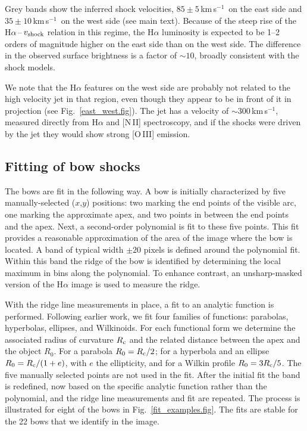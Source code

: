 \documentclass{nature_arxiv}
\newcommand{\kms}{km\,s$^{-1}$}
\begin{document}
\begin{methods}
Grey bands show the inferred shock velocities, $85\pm 5$\,\kms\
on the east side and $35\pm 10$\,\kms\ on the west side (see main text).
Because of the steep rise of the H$\alpha$\,--\,$v_{\rm shock}$ relation
in this regime, the H$\alpha$
luminosity is expected to be 1--2 orders of magnitude higher on the east side than
on the west side. The difference in the
observed surface brightness is a factor of $\sim 10$, broadly consistent with the
shock models.

We note that the H$\alpha$ features on the west side are probably not
related to the
high velocity jet in that region, even though they appear to be in front
of it in projection (see Fig.\ \ref{east_west.fig}). The jet has
a velocity of $\sim 300$\,\kms, measured directly from H$\alpha$ and
[N\,II] spectroscopy,\cite{meaburn:13} and
if the shocks were driven by the jet they would show strong [O\,III] emission.





\subsection{Fitting of bow shocks\vspace{0.3cm}\\}

The bows are fit in the following way.
A bow is initially characterized by
five manually-selected ($x$,$y$) positions:
two marking the end points of the visible arc,
one marking the approximate apex, and two points in between the end points and
the apex. Next, a second-order polynomial is fit to these five points. This
fit provides a reasonable approximation of the area of the image where the bow
is located. A band of typical width $\pm 20$ pixels is defined around the
polynomial fit. Within this band the
ridge of the bow is identified by determining the local maximum in bins along
the polynomial. To enhance contrast,
an unsharp-masked version of the H$\alpha$ image is used to measure the ridge.

With the ridge line measurements in place,
a fit to an analytic function is
performed. Following earlier work,\cite{tarango:18} we fit four families of
functions: parabolas, hyperbolas, ellipses, and Wilkinoids.\cite{Wilkin1996}
For each functional form we determine the associated radius of curvature $R_{\rm c}$
and the related distance between the apex and the object $R_0$.
For a parabola $R_0 = R_{\rm c}/2$; for a hyperbola and an ellipse $R_0 =
R_{\rm c}/(1+e)$, with $e$ the ellipticity, and for a Wilkin profile
$R_0 = 3 R_{\rm c}/5$.
The five manually selected points are not used
in the fit. After the initial fit the band is redefined, now based
on the specific analytic function rather than the polynomial, and the ridge line measurements
and fit are repeated.
The process is illustrated for eight of the bows in Fig.\ \ref{fit_examples.fig}.
The fits are stable for the 22 bows that we identify in the image.


\end{methods}
\end{document}
